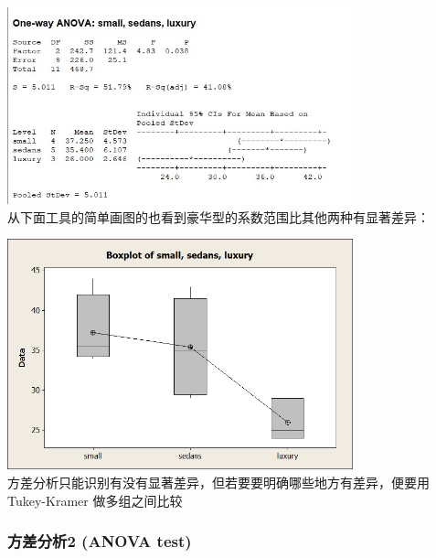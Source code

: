 
\includegraphics[width=10cm]{5anovaResultScreenshot_2022-07-24_104352.jpg}\\
从下面工具的简单画图的也看到豪华型的系数范围比其他两种有显著差异：


\includegraphics[width=10cm]{5anovaBoxplot_of_small_sedans_luxury.jpg}\\
方差分析只能识别有没有显著差异，但若要要明确哪些地方有差异，便要用
Tukey-Kramer 做多组之间比较


\hypertarget{ux65b9ux5deeux5206ux67902-anova-test}{%
\subsubsection{方差分析2 (ANOVA
test)}\label{ux65b9ux5deeux5206ux67902-anova-test}}

